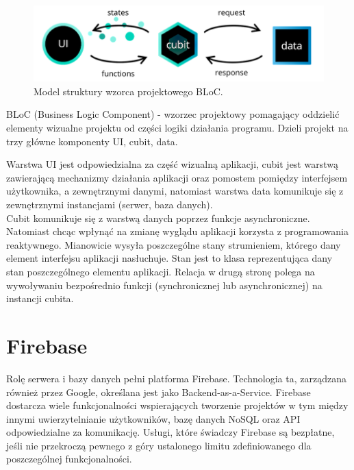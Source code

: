 \begin{figure}[h!]
	\begin{center}
		\includegraphics[width=1\textwidth]{img/cubit.png}
	\end{center}
	\caption{{\color{dgray}Model struktury wzorca projektowego BLoC.}} 
	\label{struktura_BLoC}
\end{figure}  

BLoC (Business Logic Component) - wzorzec projektowy pomagający oddzielić elementy wizualne projektu od części logiki działania programu. Dzieli projekt na trzy główne komponenty UI, cubit, data.

Warstwa UI jest odpowiedzialna za część wizualną aplikacji, cubit jest warstwą zawierającą mechanizmy działania aplikacji oraz pomostem pomiędzy interfejsem użytkownika, a zewnętrznymi danymi, natomiast warstwa data komunikuje się z zewnętrznymi instancjami (serwer, baza danych).\\

Cubit komunikuje się z warstwą danych poprzez funkcje asynchroniczne. Natomiast chcąc wpłynąć na zmianę wyglądu aplikacji korzysta z programowania reaktywnego. Mianowicie wysyła poszczególne stany strumieniem, którego dany element interfejsu aplikacji nasłuchuje. Stan jest to klasa reprezentująca dany stan poszczególnego elementu aplikacji. Relacja w drugą stronę polega na wywoływaniu bezpośrednio funkcji (synchronicznej lub asynchronicznej) na instancji cubita.

\section{Firebase}

Rolę serwera i bazy danych pełni platforma Firebase. Technologia ta, zarządzana również przez Google, określana jest jako Backend-as-a-Service. Firebase dostarcza wiele funkcjonalności 
wspierających tworzenie projektów w tym między innymi uwierzytelnianie użytkowników, bazę danych NoSQL oraz API odpowiedzialne za komunikację. Usługi, które świadczy Firebase są bezpłatne, jeśli nie przekroczą pewnego z góry ustalonego limitu zdefiniowanego dla poszczególnej funkcjonalności. 

